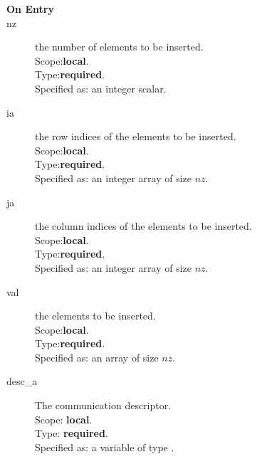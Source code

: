 %
%


\begin{description}
\item[\bf On Entry]
\item[nz] the number of elements to be inserted.\\
Scope:{\bf local}.\\
Type:{\bf required}.\\
Specified as: an integer scalar.
\item[ia] the row indices of the elements to be inserted.\\
Scope:{\bf local}.\\
Type:{\bf required}.\\
Specified as: an integer array of size $nz$.
\item[ja] the column indices of the elements to be inserted.\\
Scope:{\bf local}.\\
Type:{\bf required}.\\
Specified as: an integer array of size $nz$.
\item[val] the elements to be inserted.\\
Scope:{\bf local}.\\
Type:{\bf required}.\\
Specified as: an array of size $nz$.
\item[desc\_a] The communication descriptor.\\
Scope: {\bf local}. \\
Type: {\bf required}.\\
Specified as: a variable of type \descdata.\\
\end{description}

